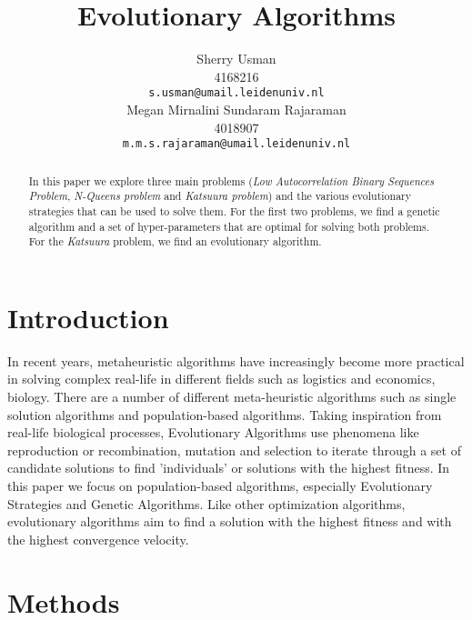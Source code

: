 \documentclass{article}
\title{Evolutionary Algorithms}
\author{
 Sherry Usman\\
  4168216\\
  \texttt{s.usman@umail.leidenuniv.nl}\\
   \And
 Megan Mirnalini Sundaram Rajaraman\\
  4018907\\
  \texttt{m.m.s.rajaraman@umail.leidenuniv.nl} \\
}
\begin{document}
\maketitle
 \begin{abstract}
In this paper we explore three main problems (\emph{Low Autocorrelation Binary Sequences Problem}, \emph{N-Queens problem} and \emph{Katsuura problem}) and the various evolutionary strategies that can be used to solve them. For the first two problems, we find a genetic algorithm and a set of hyper-parameters that are optimal for solving both problems. For the \emph{Katsuura} problem,  we find an evolutionary algorithm.
\end{abstract}




\section{Introduction}\label{sec:intro}
In recent years, metaheuristic algorithms have increasingly become more practical in solving complex real-life in different fields such as logistics and economics, biology.  There are a number of different meta-heuristic algorithms such as single solution algorithms and population-based algorithms. Taking inspiration from real-life biological processes, Evolutionary Algorithms use phenomena like reproduction or recombination, mutation and selection to iterate through a set of candidate solutions to find 'individuals' or solutions with the highest fitness. In this paper we focus on population-based algorithms, especially Evolutionary Strategies and Genetic Algorithms. Like other optimization algorithms, evolutionary algorithms aim to find a solution with the highest fitness and with the highest convergence velocity. 
\section{Methods}
\end{document}
